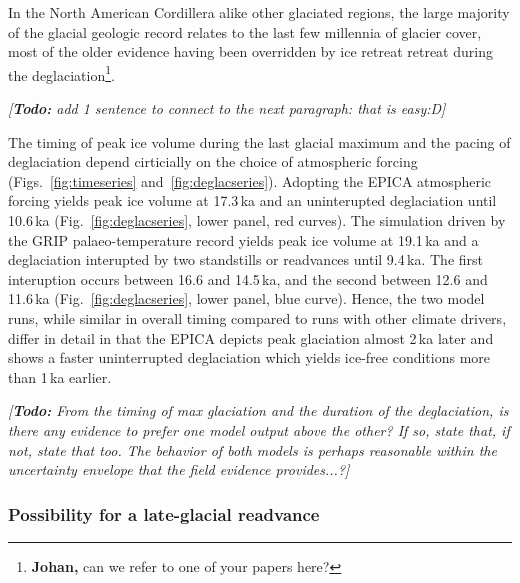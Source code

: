 \documentclass[tc, manuscript]{copernicus}
\newcommand{\todo}[1]{\emph{[\textbf{Todo:} #1]}}
\begin{document}
In the North American Cordillera alike other glaciated regions, the large
majority of the glacial geologic record relates to the last few millennia of
glacier cover, most of the older evidence having been overridden by ice retreat
retreat during the deglaciation\footnote{\textbf{Johan,} can we refer to one
of your papers here?}.

\todo{add 1 sentence to connect to the next paragraph: that is easy:D}

The timing of peak ice volume during the last glacial maximum and the pacing of
deglaciation depend cirticially on the choice of atmospheric forcing
(Figs.~\ref{fig:timeseries} and~\ref{fig:deglacseries}). Adopting the EPICA
atmospheric forcing yields peak ice volume at 17.3\,ka and an uninterupted
deglaciation until 10.6\,ka (Fig.~\ref{fig:deglacseries}, lower panel, red
curves). The simulation driven by the GRIP palaeo-temperature record yields
peak ice volume at 19.1\,ka and a deglaciation interupted by two standstills or
readvances until 9.4\,ka. The first interuption occurs between 16.6 and
14.5\,ka, and the second between 12.6 and 11.6\,ka
(Fig.~\ref{fig:deglacseries}, lower panel, blue curve). Hence, the two model
runs, while similar in overall timing compared to runs with other climate
drivers, differ in detail in that the EPICA depicts peak glaciation almost
2\,ka later and shows a faster uninterrupted deglaciation which yields ice-free
conditions more than 1\,ka earlier.

\todo{From the timing of max glaciation and the duration of the deglaciation,
is there any evidence to prefer one model output above the other? If so, state
that, if not, state that too. The behavior of both models is perhaps reasonable
within the uncertainty envelope that the field evidence provides...?}

\subsubsection{Possibility for a late-glacial readvance}
\end{document}

